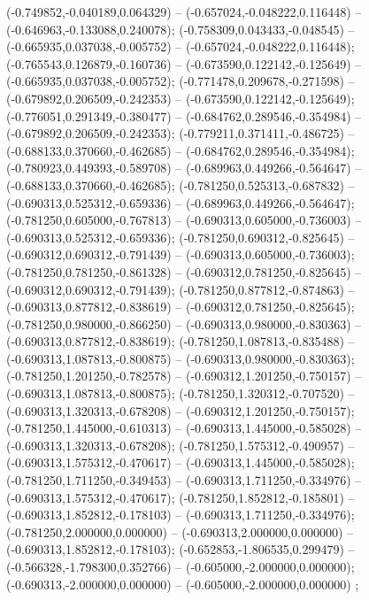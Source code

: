  (-0.749852,-0.040189,0.064329) -- (-0.657024,-0.048222,0.116448) -- (-0.646963,-0.133088,0.240078);
 (-0.758309,0.043433,-0.048545) -- (-0.665935,0.037038,-0.005752) -- (-0.657024,-0.048222,0.116448);
 (-0.765543,0.126879,-0.160736) -- (-0.673590,0.122142,-0.125649) -- (-0.665935,0.037038,-0.005752);
 (-0.771478,0.209678,-0.271598) -- (-0.679892,0.206509,-0.242353) -- (-0.673590,0.122142,-0.125649);
 (-0.776051,0.291349,-0.380477) -- (-0.684762,0.289546,-0.354984) -- (-0.679892,0.206509,-0.242353);
 (-0.779211,0.371411,-0.486725) -- (-0.688133,0.370660,-0.462685) -- (-0.684762,0.289546,-0.354984);
 (-0.780923,0.449393,-0.589708) -- (-0.689963,0.449266,-0.564647) -- (-0.688133,0.370660,-0.462685);
 (-0.781250,0.525313,-0.687832) -- (-0.690313,0.525312,-0.659336) -- (-0.689963,0.449266,-0.564647);
 (-0.781250,0.605000,-0.767813) -- (-0.690313,0.605000,-0.736003) -- (-0.690313,0.525312,-0.659336);
 (-0.781250,0.690312,-0.825645) -- (-0.690312,0.690312,-0.791439) -- (-0.690313,0.605000,-0.736003);
 (-0.781250,0.781250,-0.861328) -- (-0.690312,0.781250,-0.825645) -- (-0.690312,0.690312,-0.791439);
 (-0.781250,0.877812,-0.874863) -- (-0.690313,0.877812,-0.838619) -- (-0.690312,0.781250,-0.825645);
 (-0.781250,0.980000,-0.866250) -- (-0.690313,0.980000,-0.830363) -- (-0.690313,0.877812,-0.838619);
 (-0.781250,1.087813,-0.835488) -- (-0.690313,1.087813,-0.800875) -- (-0.690313,0.980000,-0.830363);
 (-0.781250,1.201250,-0.782578) -- (-0.690312,1.201250,-0.750157) -- (-0.690313,1.087813,-0.800875);
 (-0.781250,1.320312,-0.707520) -- (-0.690313,1.320313,-0.678208) -- (-0.690312,1.201250,-0.750157);
 (-0.781250,1.445000,-0.610313) -- (-0.690313,1.445000,-0.585028) -- (-0.690313,1.320313,-0.678208);
 (-0.781250,1.575312,-0.490957) -- (-0.690313,1.575312,-0.470617) -- (-0.690313,1.445000,-0.585028);
 (-0.781250,1.711250,-0.349453) -- (-0.690313,1.711250,-0.334976) -- (-0.690313,1.575312,-0.470617);
 (-0.781250,1.852812,-0.185801) -- (-0.690313,1.852812,-0.178103) -- (-0.690313,1.711250,-0.334976);
 (-0.781250,2.000000,0.000000) -- (-0.690313,2.000000,0.000000) -- (-0.690313,1.852812,-0.178103);
 (-0.652853,-1.806535,0.299479) -- (-0.566328,-1.798300,0.352766) -- (-0.605000,-2.000000,0.000000);
 (-0.690313,-2.000000,0.000000) -- (-0.605000,-2.000000,0.000000) ;
